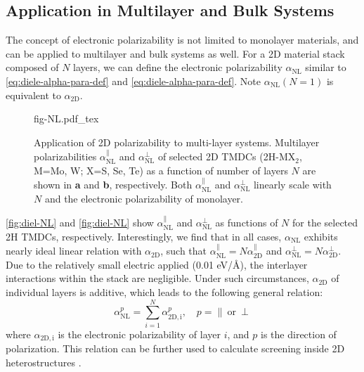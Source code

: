 \subsection{Application in Multilayer and Bulk Systems}
\label{sec:diel-apply-electr-polar}
The concept of electronic polarizability is not limited to monolayer
materials, and can be applied to multilayer and bulk systems as
well. For a 2D material stack composed of $N$ layers, we can define
the electronic polarizability $\alpha_{\mathrm{NL}}$ similar to
 \eqref{eq:diele-alpha-para-def} and \eqref{eq:diele-alpha-para-def}. Note
 $\alpha_{\mathrm{NL}}(N=1)$ is equivalent to $\alpha_{\mathrm{2D}}$.
 \begin{figure}[!htbp]
\centering
{fig-NL.pdf_tex}
\caption{\label{fig:diel-NL} %
  Application of 2D polarizability to multi-layer systems.  Multilayer
  polarizabilities $\alpha_{\mathrm{NL}}^{\parallel}$ and
  $\alpha_{\mathrm{NL}}^{\perp}$ of selected 2D TMDCs (2H-MX$_{2}$,
  M=Mo, W; X=S, Se, Te) as a function of number of layers $N$
  are shown in \textbf{a} and \textbf{b}, respectively.  Both
  $\alpha_{\mathrm{NL}}^{\parallel}$ and
  $\alpha_{\mathrm{NL}}^{\perp}$ linearly scale with $N$ and the
  electronic polarizability of monolayer.}
\end{figure}
%
 \autoref{fig:diel-NL} and \autoref{fig:diel-NL} show
$\alpha_{\mathrm{NL}}^{\parallel}$ and $\alpha_{\mathrm{NL}}^{\perp}$
as functions of $N$ for the selected 2H TMDCs,
respectively. Interestingly, we find that in all cases,
$\alpha_{\mathrm{NL}}$ exhibits nearly ideal linear relation with
$\alpha_{\mathrm{2D}}$, such that
$\alpha_{\mathrm{NL}}^{\parallel}= N \alpha_{\mathrm{2D}}^{\parallel}$
and $\alpha_{\mathrm{NL}}^{\perp}= N
\alpha_{\mathrm{2D}}^{\perp}$. Due to the relatively small
electric applied (0.01 eV/\AA{}), the interlayer interactions within
the stack are negligible. Under such circumstances, $\alpha_{\mathrm{2D}}$ of individual layers is additive, which leads to the following general relation:
\begin{equation}
  \label{eq:diele-alpha-nl}
  \alpha_{\mathrm{NL}}^{p} = \sum_{i=1}^{N} \alpha_{\mathrm{2D, i}}^{p},\quad p=\parallel\ \mathrm{or}\ \perp
\end{equation}
where $\alpha_{\mathrm{2D, i}}$ is the electronic polarizability of
layer $i$, and $p$ is the direction of polarization. This relation can
be further used to calculate screening inside 2D heterostructures
\autocite{Kumar_2016_jpcc,Andersen_2015_dielec_vdWH}.
%
%
%


